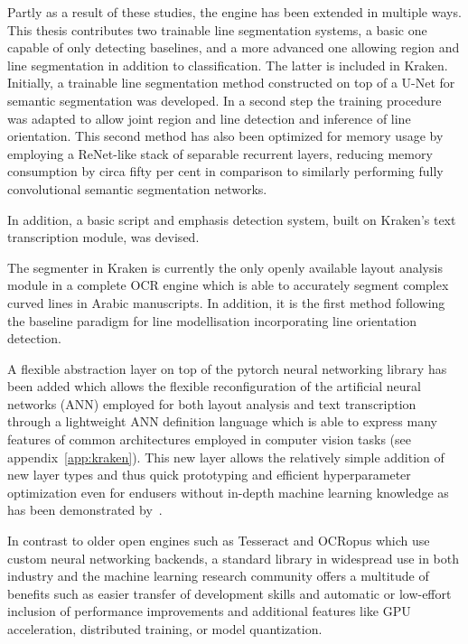 Partly as a result of these studies, the engine has been extended in multiple
ways. This thesis contributes two trainable line segmentation systems, a basic
one capable of only detecting baselines, and a more advanced one allowing
region and line segmentation in addition to classification. The latter is
included in Kraken. Initially, a trainable line segmentation method constructed
on top of a U-Net for semantic segmentation was developed. In a second step the
training procedure was adapted to allow joint region and line detection and
inference of line orientation. This second method has also been optimized for
memory usage by employing a ReNet-like stack of separable recurrent layers,
reducing memory consumption by circa fifty per cent in comparison to similarly
performing fully convolutional semantic segmentation networks.

In addition, a basic script and emphasis detection system, built on Kraken’s
text transcription module, was devised.

The segmenter in Kraken is currently the only openly available layout analysis
module in a complete OCR engine which is able to accurately segment complex
curved lines in Arabic manuscripts. In addition, it is the first method
following the baseline paradigm for line modellisation incorporating line
orientation detection. 

A flexible abstraction layer on top of the pytorch neural networking library
has been added which allows the flexible reconfiguration of the artificial
neural networks (ANN) employed for both layout analysis and text transcription
through a lightweight ANN definition language which is able to express many
features of common architectures employed in computer vision tasks (see
appendix~\ref{app:kraken}). This new layer allows the relatively simple addition of
new layer types and thus quick prototyping and efficient hyperparameter
optimization even for endusers without in-depth machine learning knowledge as
has been demonstrated by~\cite{strobel2020much}. 

In contrast to older open engines such as Tesseract and OCRopus which use
custom neural networking backends, a standard library in widespread use in both
industry and the machine learning research community offers a multitude of
benefits such as easier transfer of development skills and automatic or
low-effort inclusion of performance improvements and additional features like
GPU acceleration, distributed training, or model quantization.


